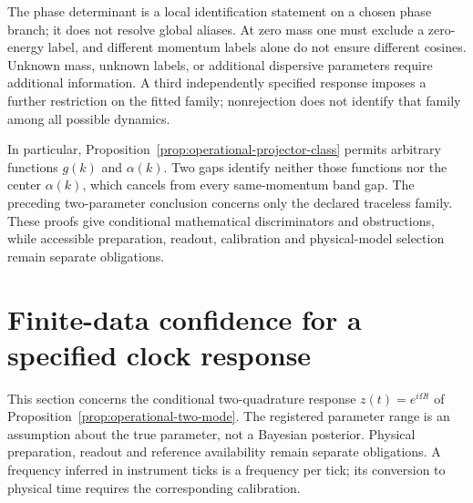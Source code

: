 \documentclass[11pt]{article}
\theoremstyle{definition}
\begin{document}
The phase determinant is a local identification statement on a chosen
phase branch; it does not resolve global aliases. At zero mass one
must exclude a zero-energy label, and different momentum labels alone
do not ensure different cosines. Unknown mass, unknown labels, or
additional dispersive parameters require additional information.
A third independently specified response imposes a further restriction
on the fitted family; nonrejection does not identify that family among
all possible dynamics.

In particular, Proposition~\ref{prop:operational-projector-class} permits
arbitrary functions $g(k)$ and $\alpha(k)$. Two gaps identify neither
those functions nor the center $\alpha(k)$, which cancels from every
same-momentum band gap. The preceding two-parameter conclusion concerns
only the declared traceless family. These proofs give conditional
mathematical discriminators and obstructions, while accessible
preparation, readout, calibration and physical-model selection remain
separate obligations.


\section{Finite-data confidence for a specified clock response}
\label{app:operational-confidence}

This section concerns the conditional two-quadrature response
$z(t)=e^{i\Omega t}$ of Proposition~\ref{prop:operational-two-mode}.
The registered parameter range is an assumption about the true parameter,
not a Bayesian posterior. Physical preparation, readout and reference
availability remain separate obligations. A frequency inferred in instrument
ticks is a frequency per tick; its conversion to physical time requires the
corresponding calibration.
\end{document}
